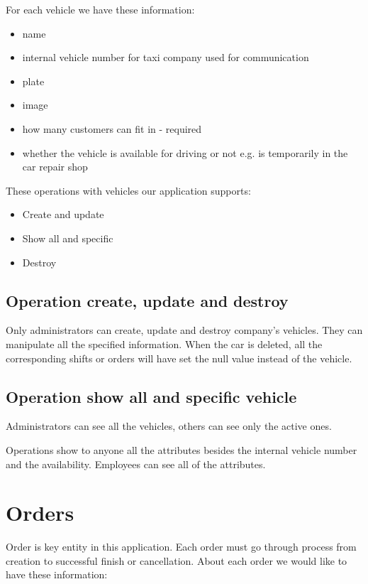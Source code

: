		 For each vehicle we have these information:
		\begin{itemize}
			\item name
			\item internal vehicle number for taxi company used for communication
			\item plate
			\item image
			\item how many customers can fit in - required
			\item whether the vehicle is available for driving or not e.g. is temporarily in the car repair shop
		\end{itemize}
		These operations with vehicles our application supports:
		\begin{itemize}
			\item Create and update
			\item Show all and specific
			\item Destroy
		\end{itemize}
		\subsection{Operation create, update and destroy}
			Only administrators can create, update and destroy company's vehicles. They can manipulate all the specified information. When the car is deleted, all the corresponding shifts or orders will have set the null value instead of the vehicle.
		\subsection{Operation show all and specific vehicle}
			Administrators can see all the vehicles, others can see only the active ones. 
			
			Operations show to anyone all the attributes besides the internal vehicle number and the availability. Employees can see all of the attributes.
	\section{Orders}
	 	Order is key entity in this application. Each order must go through process from creation to successful finish or cancellation. About each order we would like to have these information:
		
